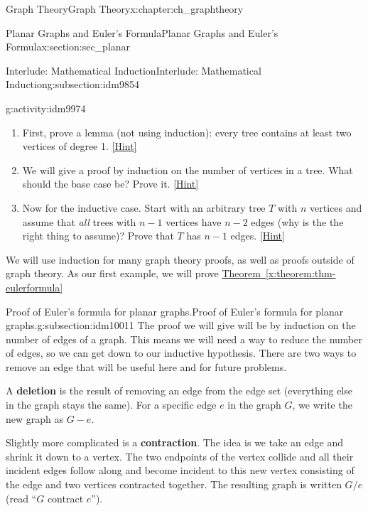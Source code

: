 \documentclass[oneside,10pt,]{book}
\newcommand{\terminology}[1]{\textbf{#1}}
\numberwithin{equation}{chapter}
\begin{document}
\begin{chapterptx}{Graph Theory}{}{Graph Theory}{}{}{x:chapter:ch_graphtheory}
\begin{sectionptx}{Planar Graphs and Euler's Formula}{}{Planar Graphs and Euler's Formula}{}{}{x:section:sec_planar}
\begin{subsectionptx}{Interlude: Mathematical Induction}{}{Interlude: Mathematical Induction}{}{}{g:subsection:idm9854}
\begin{activity}{}{g:activity:idm9974}
\begin{enumerate}[font=\bfseries,label=(\alph*),ref=\alph*]
\item{}First, prove a lemma (not using induction): every tree contains at least two vertices of degree 1.%
\space\hspace*{0pt}\hfill{\tiny\hyperlink{g:hint:idm9983-back}{[Hint]}}\item{}We will give a proof by induction on the number of vertices in a tree.  What should the base case be?  Prove it.%
\space\hspace*{0pt}\hfill{\tiny\hyperlink{g:hint:idm9991-back}{[Hint]}}\item{}Now for the inductive case.  Start with an arbitrary tree \(T\) with \(n\) vertices and assume that \emph{all} trees with \(n-1\) vertices have \(n-2\) edges (why is the the right thing to assume)?  Prove that \(T\) has \(n-1\) edges.%
\space\hspace*{0pt}\hfill{\tiny\hyperlink{g:hint:idm10004-back}{[Hint]}}\end{enumerate}
\end{activity}
We will use induction for many graph theory proofs, as well as proofs outside of graph theory.  As our first example, we will prove \hyperref[x:theorem:thm-eulerformula]{Theorem~\ref{x:theorem:thm-eulerformula}}%
\end{subsectionptx}
%
%
\typeout{************************************************}
\typeout{************************************************}
%
\begin{subsectionptx}{Proof of Euler's formula for planar graphs.}{}{Proof of Euler's formula for planar graphs.}{}{}{g:subsection:idm10011}
The proof we will give will be by induction on the number of edges of a graph.  This means we will need a way to reduce the number of edges, so we can get down to our inductive hypothesis.  There are two ways to remove an edge that will be useful here and for future problems.%
\par
{} A \terminology{deletion} is the result of removing an edge from the edge set (everything else in the graph stays the same).  For a specific edge \(e\) in the graph \(G\), we write the new graph as \(G - e\).%
\par
{} Slightly more complicated is a \terminology{contraction}.  The idea is we take an edge and shrink it down to a vertex.  The two endpoints of the vertex collide and all their incident edges follow along and become incident to this new vertex consisting of the edge and two vertices contracted together.  The resulting graph is written \(G/e\) (read ``\(G\) contract \(e\)'').%

\end{subsectionptx}
\end{sectionptx}
\end{chapterptx}
\end{document}
